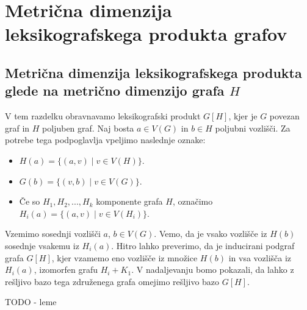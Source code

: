 \documentclass[mat1, tisk]{fmfdelo}
\newcommand{\1}{(1, 1, ..., 1)}
\newcommand{\2}{(2, 2, ..., 2)}
\begin{document}
\section{Metrična dimenzija leksikografskega produkta grafov}\label{s:mdim_prod}
 



\subsection{Metrična dimenzija leksikografskega produkta glede na metrično 
dimenzijo grafa $H$} \label{ss:mdim_komp_prod}

V tem razdelku obravnavamo leksikografski produkt $G[H]$, kjer je $G$ povezan graf in $H$ 
poljuben graf. Naj bosta $a \in V(G)$ in $b \in H$ poljubni vozlišči. Za potrebe tega 
podpoglavlja vpeljimo naslednje oznake:
\begin{itemize}
    \item $H(a) = \{ (a, v) \; | \; v \in V(H) \}$.
    \item $G(b) = \{ (v, b) \; | \; v \in V(G) \}$.
    \item Če so $H_1, H_2, ..., H_k$ komponente grafa $H$, označimo 
    $H_i(a) = \{ (a, v) \; | \; v \in V(H_i) \}$.
\end{itemize}

Vzemimo sosednji vozlišči $a$, $b \in V(G)$. Vemo, da je vsako vozlišče iz $H(b)$ 
sosednje vsakemu iz $H_i(a).$ 
Hitro lahko preverimo, da je inducirani podgraf grafa $G[H]$, kjer vzamemo eno 
vozlišče iz množice $H(b)$ in vsa vozlišča iz $H_i(a)$, izomorfen grafu $H_i + K_1.$ 
V nadaljevanju bomo pokazali, da lahko z rešljivo bazo tega združenega grafa
omejimo rešljivo bazo $G[H]$.

TODO - leme


        
\end{document}
